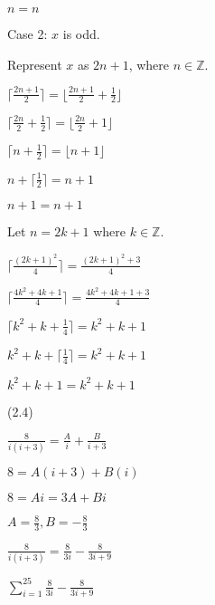 \documentclass{exam}
\begin{document}
\begin{questions}
\begin{subparts}
\begin{center}
\( n = n \)
\vspace{5px}

Case 2: \(x\) is odd.

Represent \(x\) as \(2n + 1\), where \(n \in \mathbb{Z}\).

\( \lceil \frac{2n+1}{2} \rceil = \lfloor \frac{2n+1}{2} + \frac{1}{2} \rfloor \)

\( \lceil \frac{2n}{2} + \frac{1}{2} \rceil = \lfloor \frac{2n}{2} + 1 \rfloor \)

\( \lceil n + \frac{1}{2} \rceil = \lfloor n + 1 \rfloor \)

\( n + \lceil \frac{1}{2} \rceil = n + 1 \)

\( n + 1 = n + 1 \)

\end{center}


\begin{center}

Let \(n = 2k + 1\) where \(k \in \mathbb{Z}\).

\( \lceil \frac{(2k+1)^2}{4} \rceil = \frac{(2k+1)^2 + 3}{4} \)

\( \lceil \frac{4k^2 + 4k + 1}{4} \rceil = \frac{4k^2 + 4k + 1 + 3}{4} \)

\( \lceil k^2 + k + \frac{1}{4} \rceil = k^2 + k + 1 \)

\(  k^2 + k + \lceil \frac{1}{4} \rceil = k^2 + k + 1 \)

\(  k^2 + k + 1 = k^2 + k + 1 \)

\end{center}

\end{subparts}

 (2.4)
\begin{subparts}

\begin{center}

\( \frac{8}{i(i+3)} = \frac{A}{i} + \frac{B}{i+3} \)

\( 8 = A(i+3) + B(i) \)

\( 8 = Ai = 3A + Bi \)

\( A = \frac{8}{3}, B = -\frac{8}{3} \)

\( \frac{8}{i(i+3)} = \frac{8}{3i} - \frac{8}{3i+9} \)
\vspace{5px}

\( \sum_{i=1}^{25} \frac{8}{3i} - \frac{8}{3i+9} \)


\end{center}
\end{subparts}
\end{questions}
\end{document}
